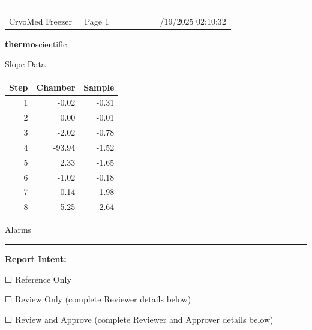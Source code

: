 \documentclass[UTF8,10pt,a4paper,fontset=fandol]{ctexart}
\newcommand{\fieldvalue}[1]{#1}
\newcommand{\checkboxfield}[1]{\ifstrequal{#1}{checked}{☑}{\ifstrequal{#1}{unclear}{?}{☐}}}
\begin{document}
\vfill

\noindent\rule{\linewidth}{0.4pt}

\noindent
\begin{tabular}{@{}p{0.33\linewidth}p{0.33\linewidth}p{0.33\linewidth}@{}}
CryoMed Freezer & \centering Page 1 & \raggedleft 06/19/2025 02:10:32
\end{tabular}

\newpage

\begin{flushright}
\textsf{\textbf{thermo}scientific}
\end{flushright}

\noindent
\begin{minipage}[t]{0.36\linewidth}
\centering
Slope Data

\vspace{2mm}
\begin{tabular}{r r r}
\hline
\textbf{Step} & \textbf{Chamber} & \textbf{Sample} \\
\hline
1 & -0.02 & -0.31 \\
2 & 0.00 & -0.01 \\
3 & -2.02 & -0.78 \\
4 & -93.94 & -1.52 \\
5 & 2.33 & -1.65 \\
6 & -1.02 & -0.18 \\
7 & 0.14 & -1.98 \\
8 & -5.25 & -2.64 \\
\hline
\end{tabular}
\end{minipage}
\hfill
\begin{minipage}[t]{0.52\linewidth}
\centering
Alarms

\vspace{2mm}
\rule{\linewidth}{0.4pt}
\end{minipage}

\vspace{8mm}

\noindent\textbf{Report Intent:}

\noindent
\fieldvalue{\checkboxfield{unchecked}} Reference Only

\noindent
\fieldvalue{\checkboxfield{unchecked}} Review Only (complete Reviewer details below)

\noindent
\fieldvalue{\checkboxfield{unchecked}} Review and Approve (complete Reviewer and Approver details below)
\end{document}
